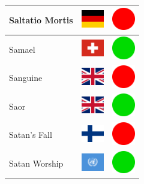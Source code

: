 \documentclass[12pt, a4paper, twoside]{report}
\begin{document}
\begin{center}
\begin{longtable}{|p{5cm}|p{2cm}|p{2cm}|}
Saltatio Mortis & \includegraphics[width=1cm]{4x3/de} & \includegraphics[width=1cm]{likes/n} \\ \hline
Samael & \includegraphics[width=1cm]{4x3/ch} & \includegraphics[width=1cm]{likes/y} \\ \hline
Sanguine & \includegraphics[width=1cm]{4x3/gb} & \includegraphics[width=1cm]{likes/n} \\ \hline
Saor & \includegraphics[width=1cm]{4x3/gb} & \includegraphics[width=1cm]{likes/y} \\ \hline
Satan's Fall & \includegraphics[width=1cm]{4x3/fi} & \includegraphics[width=1cm]{likes/n} \\ \hline
Satan Worship & \includegraphics[width=1cm]{4x3/un} & \includegraphics[width=1cm]{likes/y} \\ \hline

\end{longtable}
\end{center}
\end{document}
